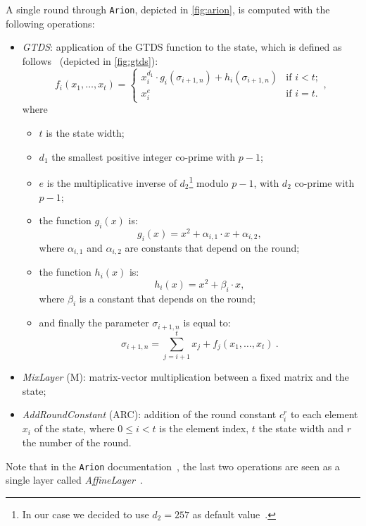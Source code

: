 \documentclass[12pt, a4paper]{report}
\begin{document}
A single round through \texttt{Arion}, depicted in \autoref{fig:arion}, is computed with the following operations:
\begin{itemize}
  \item \textit{GTDS}: application of the GTDS function to the state, which is defined as follows~\cite[Def.~1]{arion} (depicted in \autoref{fig:gtds}):
    \begin{equation}
      f_i(x_1, \ldots, x_t) = \left\{
          \begin{array}{ll}
            x_i^{d_1} \cdot g_i(\sigma_{i+1, n}) + h_i(\sigma_{i+1, n}) & \text{if } i < t; \\
            x_i^{e} & \text{if } i = t.
          \end{array}
        \right. ,
      \label{eq:gtds}
    \end{equation}
    where
    \begin{itemize}
      \item $t$ is the state width;
      \item $d_1$ the smallest positive integer co-prime with $p-1$;
      \item $e$ is the multiplicative inverse of $d_2$\footnote{In our case we decided to use $d_2 = 257$ as default value~\cite[Tab.~2]{arion}.} modulo $p-1$, with $d_2$ co-prime with $p-1$;
      \item the function $g_i(x)$ is:
        \begin{equation}
          g_i(x) = x^2 + \alpha_{i,1} \cdot x + \alpha_{i,2} ,
          \label{eq:g}
        \end{equation}
        where $\alpha_{i,1}$ and $\alpha_{i,2}$ are constants that depend on the round;
      \item the function $h_i(x)$ is:
        \begin{equation}
          h_i(x) = x^2 + \beta_i \cdot x,
          \label{eq:h}
        \end{equation}
        where $\beta_i$ is a constant that depends on the round;
      \item and finally the parameter $\sigma_{i+1, n}$ is equal to:
        \begin{equation}
          \sigma_{i+1, n} = \sum_{j=i+1}^{t} x_j + f_j(x_1, \ldots, x_t)\ .
          \label{eq:theta}
        \end{equation}
    \end{itemize}
  \item \textit{MixLayer} (M): matrix-vector multiplication between a fixed matrix and the state;
  \item \textit{AddRoundConstant} (ARC): addition of the round constant $c^r_i$ to each element $x_i$ of the state, where $0 \le i < t$ is the element index, $t$ the state width and $r$ the number of the round.
\end{itemize}
\begin{note}
  Note that in the \texttt{Arion} documentation~\cite{arion}, the last two operations are seen as a single layer called \textit{AffineLayer}~\cite[Def.~3]{arion}.
\end{note}
\end{document}
